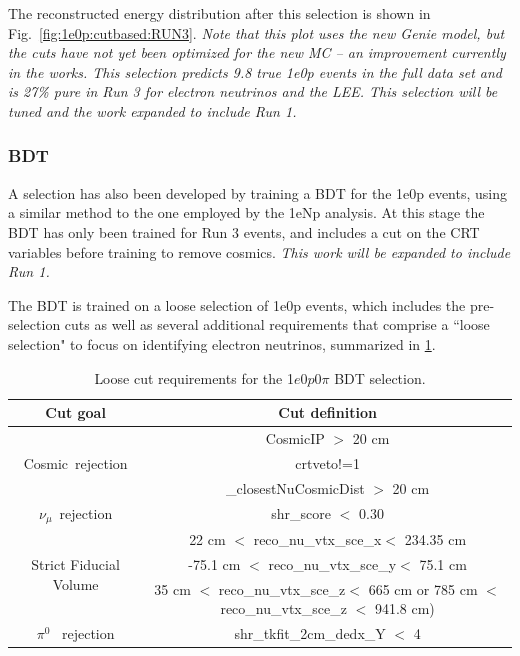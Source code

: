 \documentclass[a4paper]{article}
\newcommand{\zpsel}{1$e$0$p$0$\pi$ }
\begin{document}
The reconstructed energy distribution after this selection is shown in Fig.~\ref{fig:1e0p:cutbased:RUN3}.  \emph{Note that this plot uses the new Genie model, but the cuts have not yet been optimized for the new MC -- an improvement currently in the works.  This selection predicts 9.8 true 1e0p events in the full data set and is 27\% pure in Run 3 for electron neutrinos and the LEE.  This selection will be tuned and the work expanded to include Run 1.}

\subsubsection{BDT}

A selection has also been developed by training a BDT for the 1e0p events, using a similar method to the one employed by the 1eNp analysis.  At this stage the BDT has only been trained for Run 3 events, and includes a cut on the CRT variables before training to remove cosmics.  \emph{This work will be expanded to include Run 1.}

The BDT is trained on a loose selection of 1e0p events, which includes the pre-selection cuts as well as several additional requirements that comprise a ``loose selection" to focus on identifying electron neutrinos, summarized in \ref{tab:1e0p:loosecut}.


\begin{table}[h!]
\centering
\setlength{\tabcolsep}{10pt}
\renewcommand{\arraystretch}{1.25}
 \begin{tabular}{| c | c |} 
 \hline
 Cut goal & Cut definition \\
 \hline\hline
\multirow{3}{*}{Cosmic~rejection} & CosmicIP $>$ 20 \si{\cm} \\
& crtveto!=1  \\ & \_closestNuCosmicDist $>$ 20 \si{\cm}\\
 \hline
\multirow{1}{*}{$\nu_\mu$~rejection} & shr\_score $<$ 0.30 \\
 \hline
\multirow{3}{*}{Strict Fiducial Volume} & 22 \si{\cm} $<$ reco\_nu\_vtx\_sce\_x$<$ 234.35 \si{\cm} \\
& -75.1 \si{\cm} $<$ reco\_nu\_vtx\_sce\_y$<$ 75.1 \si{\cm} \\ & 35 \si{\cm} $<$ reco\_nu\_vtx\_sce\_z$<$ 665 \si{\cm}  or 785 \si{\cm} $<$ reco\_nu\_vtx\_sce\_z $<$ 941.8 \si{\cm})\\
 \hline
 \multirow{1}{*}{$\pi^0$ ~rejection} & shr\_tkfit\_2cm\_dedx\_Y $<$ 4 \\
 \hline
 \end{tabular}
 \caption{\label{tab:1e0p:loosecut} Loose cut requirements for the \zpsel BDT selection.}
\end{table}
\end{document}
